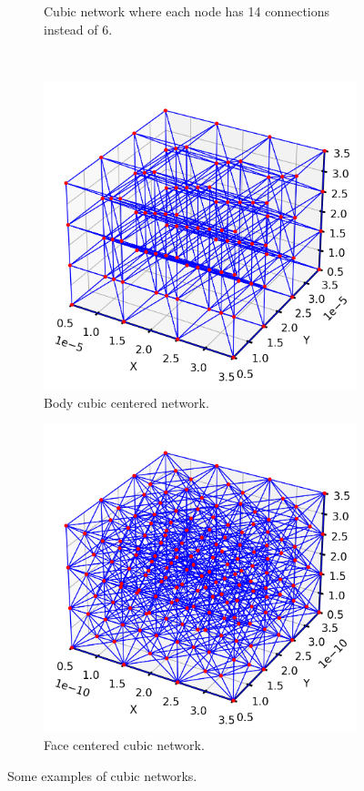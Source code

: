 \documentclass{article}
\begin{document}
\begin{figure}[htbp]
\begin{subfigure}[b]{0.48\textwidth}
        \caption{Cubic network where each node has 14 connections instead of 6.}
    \end{subfigure}
    \\
    \begin{subfigure}[b]{0.48\textwidth}
        \centering
        \includegraphics[width=\textwidth]{images/3dBcc.png}
        \caption{Body cubic centered network.}
    \end{subfigure}
    \hfill
    \begin{subfigure}[b]{0.48\textwidth}
        \centering
        \includegraphics[width=\textwidth]{images/3dFcc.png}
        \caption{Face centered cubic network.}
    \end{subfigure}
    \caption{Some examples of cubic networks.}
    \label{fig:CubicNetworks}
\end{figure}
\end{document}
